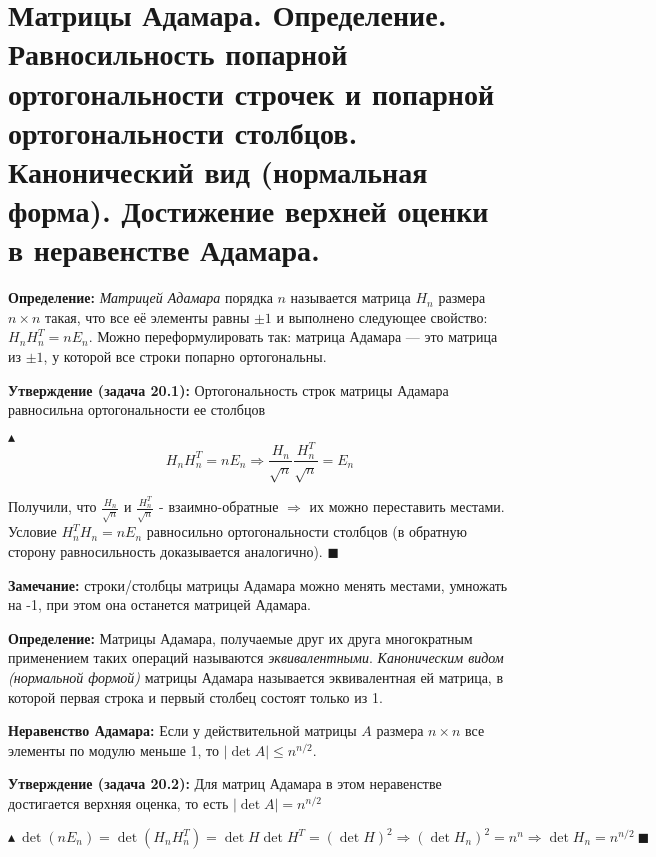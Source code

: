 \setcounter{section}{14}
\section{Матрицы Адамара. Определение. Равносильность попарной ортогональности строчек и попарной ортогональности столбцов. Канонический вид (нормальная форма). Достижение верхней оценки в неравенстве Адамара.}
\par \textbf{Определение:} \textit{Матрицей Адамара} порядка $n$ называется матрица $H_n$ размера $n \times n$ такая, что все
её элементы равны $\pm 1$ и выполнено следующее свойство:
$H_n H_n^T = nE_n$.
Можно переформулировать так: матрица Адамара — это матрица из $\pm 1$, у которой все строки попарно ортогональны.
\par \textbf{Утверждение (задача 20.1):} Ортогональность строк матрицы Адамара равносильна ортогональности ее столбцов
\par $\blacktriangle$ $$H_n H_n^T = nE_n \Rightarrow \frac{H_n}{\sqrt{n}} \frac{H_n^T}{\sqrt{n}} = E_n$$
\par Получили, что $\frac{H_n}{\sqrt{n}}$ и $\frac{H_n^T}{\sqrt{n}}$ - взаимно-обратные $\Rightarrow$ их можно переставить местами. Условие $H_n^T H_n = nE_n$ равносильно ортогональности столбцов (в обратную сторону равносильность доказывается аналогично). $\blacksquare$
\par \textbf{Замечание:} строки/столбцы матрицы Адамара можно менять местами, умножать на -1, при этом она останется матрицей Адамара.
\par \textbf{Определение:} Матрицы Адамара, получаемые друг их друга многократным применением таких операций называются \textit{эквивалентными}. \textit{Каноническим видом (нормальной формой)} матрицы Адамара называется эквивалентная ей матрица, в которой первая строка и первый столбец состоят только из 1.
\par \textbf{Неравенство Адамара:} Если у действительной матрицы $A$ размера $n \times n$ все элементы по модулю
меньше 1, то $|\det A| \leq n^{n/2}$.
\par \textbf{Утверждение (задача 20.2):} Для матриц Адамара в этом неравенстве достигается верхняя оценка, то есть $| \det A| = n^{n/2}$
\par $$\blacktriangle \: \det(n E_n)=\det(H_n  H_n^T)=\det H \det H^T=(\det H)^2 \Rightarrow (\det H_n)^2=n^n \Rightarrow \det H_n = n^{n/2} \: \blacksquare$$